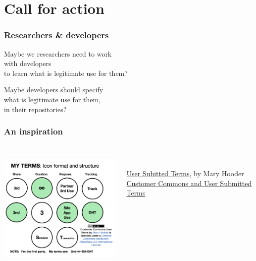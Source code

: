 \documentclass[17pt,aspectratio=169,hyperref={pdfusetitle,colorlinks,allcolors=olive}]{beamer}
\begin{document}
\section{Call for action}

\begin{frame}[fragile]
  \frametitle{Researchers \& developers}

  Maybe we researchers need to work \\
  with developers \\
  to learn what is legitimate use for them? \\
  \vspace{.5cm}
  
  Maybe developers should specify \\
  what is legitimate use for them, \\
  in their repositories? \\
  
\end{frame}

\begin{frame}[fragile]
  \frametitle{An inspiration}
  
  \begin{columns}[T]
    \begin{column}{.58\textwidth}
      \includegraphics[height=6cm]{figs/user-terms}
    \end{column}%
    \hfill%
    \begin{column}{.40\textwidth}
      {\footnotesize
        ~
        \vspace{3cm}
        \begin{flushright}
          \href{https://kantarainitiative.org/confluence/display/infosharing/User+Submitted+Terms+--+UX+and+Interface+V.1}{User Subitted Terms}, by Mary Hooder \\
          \href{http://customercommons.org/2014/10/27/customer-commons-and-user-submitted-terms/}{Customer Commons and User Submitted Terms} \\
        \end{flushright}
      }
    \end{column}%
  \end{columns}

\end{frame}
\end{document}
